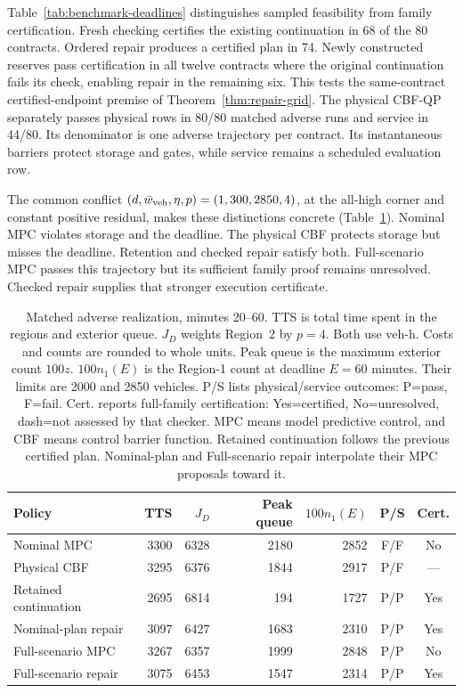 \documentclass[preprint,12pt]{elsarticle}
\begin{document}
Table~\ref{tab:benchmark-deadlines} distinguishes sampled feasibility from
family certification. Fresh checking certifies the existing continuation in 68 of the 80
contracts. Ordered repair produces a certified plan in 74. Newly constructed
reserves pass certification in all twelve contracts where the original
continuation fails its check, enabling repair in the remaining six. This tests
the same-contract certified-endpoint premise of
Theorem~\ref{thm:repair-grid}. The physical CBF-QP separately passes physical
rows in 80/80 matched adverse runs and service in 44/80. Its denominator is
one adverse trajectory per contract. Its instantaneous barriers protect
storage and gates, while service remains a scheduled evaluation row.

The common conflict $(d,\bar w_{\rm veh},\eta,p)=(1,300,2850,4)$, at the all-high
corner and constant positive residual, makes these distinctions concrete
(Table~\ref{tab:benchmark-conflict}). Nominal MPC violates storage and the
deadline. The physical CBF protects storage but misses the deadline.
Retention and checked repair satisfy both. Full-scenario MPC passes this
trajectory but its sufficient family proof remains unresolved. Checked
repair supplies that stronger execution certificate.

\begin{table}[t]
\centering\footnotesize
\caption{Matched adverse realization, minutes 20--60. TTS is total
time spent in the regions and exterior queue. $J_D$ weights Region~2 by
$p=4$. Both use veh-h. Costs and counts are rounded to whole
units. Peak queue is the maximum exterior count $100z$. $100n_1(E)$ is the
Region-1 count at deadline $E=60$ minutes. Their limits are 2000 and 2850
vehicles. P/S lists physical/service outcomes: P=pass, F=fail. Cert.
reports full-family certification: Yes=certified, No=unresolved,
dash=not assessed by that checker.
MPC means model predictive control, and CBF means control barrier function.
Retained continuation follows the previous certified plan. Nominal-plan
and Full-scenario repair interpolate their MPC proposals toward it.}
\label{tab:benchmark-conflict}
\setlength{\tabcolsep}{3pt}
\begin{tabular}{@{}lrrrrcc@{}}
\toprule
Policy & TTS & $J_D$ & Peak queue & $100n_1(E)$ & P/S & Cert.\\
\midrule
Nominal MPC & 3300 & 6328 & 2180 & 2852 & F/F & No\\
Physical CBF & 3295 & 6376 & 1844 & 2917 & P/F & ---\\
Retained continuation & 2695 & 6814 & 194 & 1727 & P/P & Yes\\
Nominal-plan repair & 3097 & 6427 & 1683 & 2310 & P/P & Yes\\
Full-scenario MPC & 3267 & 6357 & 1999 & 2848 & P/P & No\\
Full-scenario repair & 3075 & 6453 & 1547 & 2314 & P/P & Yes\\
\bottomrule
\end{tabular}
\end{table}
\end{document}
